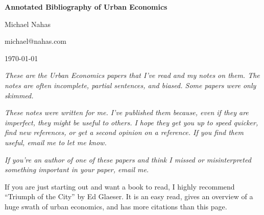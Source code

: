\documentclass[12pt]{article}
\begin{document}
\begin{center}
   {\Large\textbf{Annotated Bibliography of Urban Economics}}
\medskip

   {\large   Michael Nahas
\medskip

	michael@nahas.com
\medskip

           \today
   }
\end{center}

\emph{These are the Urban Economics papers that I've read and my notes on them.  The notes are often incomplete, partial sentences, and biased.  Some papers were only skimmed.}

\emph{These notes were written for me.  I've published them because, even if they are imperfect, they might be useful to others.  I hope they get you up to speed quicker, find new references, or get a second opinion on a reference.  If you find them useful, email me to let me know.}

\emph{If you're an author of one of these papers and think I missed or misinterpreted something important in your paper, email me. }


If you are just starting out and want a book to read, I highly recommend ``Triumph of the City'' by Ed Glaeser.\cite{Glaeser2011}  It is an easy read, gives an overview of a huge swath of urban economics, and has more citations than this page.  

\nocite{*}



\end{document}

